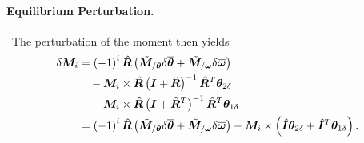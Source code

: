 \documentclass[10pt,dvips,fleqn,subeqn]{report}
\newcommand{\T}[1]{\bm{#1}}
\begin{document}
\paragraph{Equilibrium Perturbation.} \
The perturbation of the moment then yields
\begin{align}
	\delta\T{M}_i
	&= \plbr{-1}^i \hat{\T{R}} \plbr{
		\tilde{\T{M}}_{/\T{\theta}} \delta\overline{\T{\theta}}
		+ \tilde{\T{M}}_{/\T{\omega}} \delta\overline{\T{\omega}}
	} \nonumber \\
	& \mbox{\hspace{10pt}} - \T{M}_i \times \hat{\T{R}}
		\plbr{\T{I} + \tilde{\T{R}}}^{-1} \hat{\T{R}}^T \T{\theta}_{2\delta}
	\nonumber \\
	& \mbox{\hspace{10pt}} - \T{M}_i \times \hat{\T{R}} 
		\plbr{\T{I} + \tilde{\T{R}}^T}^{-1} \hat{\T{R}}^T \T{\theta}_{1\delta} \nonumber \\
	&= \plbr{-1}^i \hat{\T{R}} \plbr{
		\tilde{\T{M}}_{/\T{\theta}} \delta\overline{\T{\theta}}
		+ \tilde{\T{M}}_{/\T{\omega}} \delta\overline{\T{\omega}}
	} - \T{M}_i \times \plbr{
		\hat{\T{I}} \T{\theta}_{2\delta}
		+ \hat{\T{I}}^T \T{\theta}_{1\delta}
	} .
\end{align}
\end{document}
